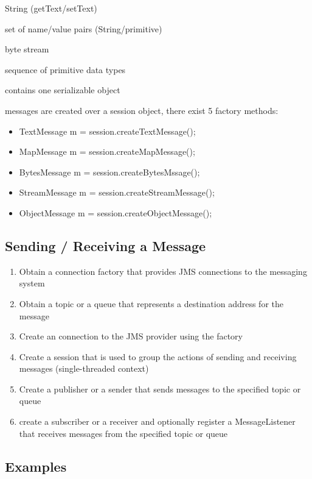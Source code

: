 \documentclass[10pt]{article}
\begin{document}
\begin{description}
	\item[TextMessage] String (getText/setText)
	\item[MapMessage] set of name/value pairs (String/primitive)
	\item[BytesMessage] byte stream
	\item[StreamMessage] sequence of primitive data types
	\item[ObjectMessage] contains one serializable object
	\item messages are created over a session object, there exist 5 factory methods:
		\begin{itemize}
			\item TextMessage m = session.createTextMessage();
			\item MapMessage m = session.createMapMessage();
			\item BytesMessage m = session.createBytesMssage();
			\item StreamMessage m = session.createStreamMessage();
			\item ObjectMessage m = session.createObjectMessage();
		\end{itemize}
\end{description}
\subsection{Sending / Receiving a Message}
\begin{enumerate}
	\item Obtain a connection factory that provides JMS connections to the messaging system
	\item Obtain a topic or a queue that represents a destination address for the message
	\item Create an connection to the JMS provider using the factory
	\item Create a session that is used to group the actions of sending and receiving messages (single-threaded context)
	\item Create a publisher or a sender that sends messages to the specified topic or queue
	\item create a subscriber or a receiver and optionally register a MessageListener that receives messages from the specified topic or queue
\end{enumerate}
\subsection{Examples}
\end{document}
